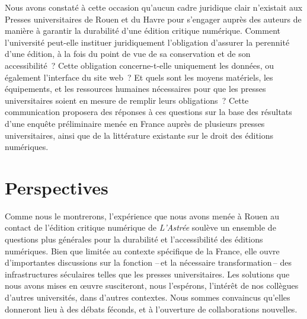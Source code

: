 \documentclass[final,fra]{anthology-ch} %
\begin{document}
Nous avons constaté à cette occasion qu'aucun cadre juridique clair
n'existait aux Presses universitaires de Rouen et du Havre pour
s'engager auprès des auteurs de manière à garantir la durabilité d'une
édition critique numérique. Comment l'université peut-elle instituer
juridiquement l'obligation d'assurer la perennité d'une édition, à la
fois du point de vue de sa conservation et de son accessibilité~? Cette
obligation concerne-t-elle uniquement les données, ou également
l'interface du site web~? Et quels sont les moyens matériels, les
équipements, et les ressources humaines nécessaires pour que les presses
universitaires soient en mesure de remplir leurs obligations~? Cette
communication proposera des réponses à ces questions sur la base des
résultats d'une enquête préliminaire menée en France auprès de plusieurs presses universitaires, ainsi que de la littérature existante sur le droit des éditions numériques.

\section{Perspectives}\label{perspectives}

Comme nous le montrerons, l'expérience que nous avons menée à Rouen au
contact de l'édition critique numérique de \emph{L'Astrée} soulève un
ensemble de questions plus générales pour la durabilité et
l'accessibilité des éditions numériques. Bien que limitée au contexte
spécifique de la France, elle ouvre d'importantes discussions sur la
fonction --\,et la nécessaire transformation\,-- des infrastructures
séculaires telles que les presses universitaires. Les solutions que nous
avons mises en œuvre susciteront, nous l'espérons, l'intérêt de nos
collègues d'autres universités, dans d'autres contextes. Nous sommes
convaincus qu'elles donneront lieu à des débats féconds, et à
l'ouverture de collaborations nouvelles.

\printbibliography




\end{document}
